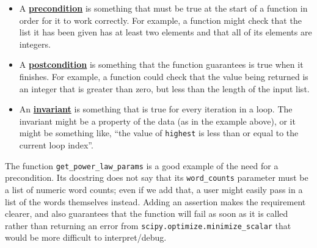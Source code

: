 \documentclass[
]{krantz}
\newcommand{\gref}[2]{\hyperlink{#2}{\textbf{#1}}}
\begin{document}
\begin{itemize}
\item
  A \gref{precondition}{precondition}
  is something that must be true at the start of a function
  in order for it to work correctly.
  For example,
  a function might check that the list it has been given has at least two elements
  and that all of its elements are integers.
\item
  A \gref{postcondition}{postcondition}
  is something that the function guarantees is true
  when it finishes.
  For example,
  a function could check that the value being returned is an integer
  that is greater than zero,
  but less than the length of the input list.
\item
  An \gref{invariant}{invariant}
  is something that is true for every iteration in a loop.
  The invariant might be a property of the data (as in the example above),
  or it might be something like,
  ``the value of \texttt{highest} is less than or equal to the current loop index''.
\end{itemize}

The function \texttt{get\_power\_law\_params} is a good example of the need for a precondition.
Its docstring does not say that its \texttt{word\_counts} parameter must be a list of numeric word counts;
even if we add that,
a user might easily pass in a list of the words themselves instead.
Adding an assertion makes the requirement clearer,
and also guarantees that the function will fail as soon as it is called
rather than returning an error from \texttt{scipy.optimize.minimize\_scalar}
that would be more difficult to interpret/debug.
\end{document}
